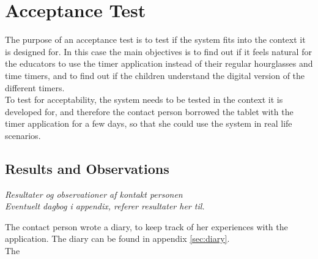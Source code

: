 \section{Acceptance Test}

The purpose of an acceptance test\cite{misc:designInterSys} is to test if the system fits into the context it is designed for. In this case the main objectives is to find out if it feels natural for the educators to use the timer application instead of their regular hourglasses and time timers, and to find out if the children understand the digital version of the different timers.\\
To test for acceptability, the system needs to be tested in the context it is developed for, and therefore the contact person borrowed the tablet with the timer application for a few days, so that she could use the system in real life scenarios. 

\subsection{Results and Observations}
\textit{Resultater og observationer af kontakt personen\\
Eventuelt dagbog i appendix, referer resultater her til.}

The contact person wrote a diary, to keep track of her experiences with the application. The diary can be found in appendix \ref{sec:diary}.\\
The 